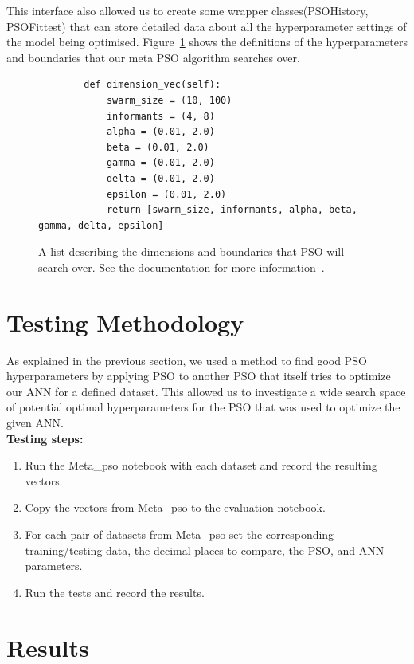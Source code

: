 \documentclass[11pt]{article}
\begin{document}
This interface also allowed us to create some wrapper classes(PSOHistory, PSOFittest) that can store detailed data about all the hyperparameter settings of the model being optimised.
Figure~\ref{fig:dimensionVec} shows the definitions of  the hyperparameters and boundaries that our meta PSO algorithm searches over. 

\begin{figure}[h]
    \caption{A list describing the dimensions and boundaries that PSO will search over. See the documentation for more information~\autocite{fay-huntBiologicallyInspiredComputation}.}
    \label{fig:dimensionVec}
    \begin{verbatim}
        def dimension_vec(self):
            swarm_size = (10, 100)
            informants = (4, 8)
            alpha = (0.01, 2.0)
            beta = (0.01, 2.0)
            gamma = (0.01, 2.0)
            delta = (0.01, 2.0)
            epsilon = (0.01, 2.0)
            return [swarm_size, informants, alpha, beta, gamma, delta, epsilon]
    \end{verbatim}
\end{figure}


\newpage
\section{Testing Methodology}

As explained in the previous section, we used a method to find good PSO hyperparameters by applying PSO to another PSO that itself tries to optimize our ANN for a defined dataset.
This allowed us to investigate a wide search space of potential optimal hyperparameters for the PSO that was used to optimize the given ANN.\\

\noindent\textbf{Testing steps:}
\begin{enumerate}
    \item Run the Meta\_pso notebook with each dataset and record the resulting vectors.
    \item Copy the vectors from Meta\_pso to the evaluation notebook.
    \item For each pair of datasets from Meta\_pso set the corresponding training/testing data, the decimal places to compare, the PSO, and ANN parameters.
    \item Run the tests and record the results.
\end{enumerate}



\newpage
\section{Results}
\end{document}
